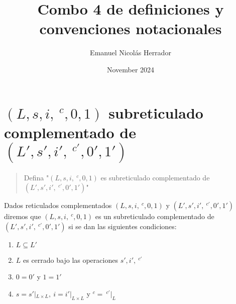 \documentclass{article}
\title{Combo 4 de definiciones y convenciones notacionales}
\author{Emanuel Nicolás Herrador}
\date{November 2024}
\begin{document}
\maketitle

\section{$(L,s,i,\ ^c,0,1)$ subreticulado complementado de $(L',s',i',\ ^{c'},0',1')$}
\begin{quote}
  Defina "$(L,s,i,\ ^c,0,1)$ es subreticulado complementado de $(L',s',i',\ ^{c'},0',1')$"
\end{quote}
Dados reticulados complementados $(L,s,i,\ ^c,0,1)$ y $(L',s',i',\ ^{c'},0',1')$ diremos que $(L,s,i,\ ^c,0,1)$ es un subreticulado complementado de $(L',s',i',\ ^{c'},0',1')$ si se dan las siguientes condiciones:
\begin{enumerate}
  \item $L\subseteq L'$
  \item $L$ es cerrado bajo las operaciones $s',i',\ ^{c'}$
  \item $0=0'$ y $1=1'$
  \item $s=s'|_{L\times L},\ i=i'|_{L\times L}$ y $^c=\ ^{c'}|_{L}$
\end{enumerate}
\end{document}
